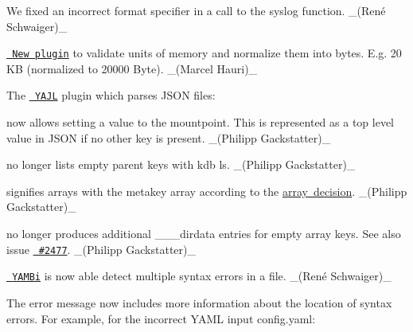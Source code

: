 \begin{DoxyItemize}
\item We fixed an incorrect format specifier in a call to the {\ttfamily syslog} function. \+\_\+(René Schwaiger)\+\_\+
\end{DoxyItemize}


\begin{DoxyItemize}
\item \href{https://www.libelektra.org/plugins/unit}{\texttt{ New plugin}} to validate units of memory and normalize them into bytes. E.\+g. 20 KB (normalized to 20000 Byte). \+\_\+(\+Marcel Hauri)\+\_\+
\end{DoxyItemize}

The \href{https://www.libelektra.org/plugins/yajl}{\texttt{ Y\+A\+JL}} plugin which parses J\+S\+ON files\+:


\begin{DoxyItemize}
\item now allows setting a value to the mountpoint. This is represented as a top level value in J\+S\+ON if no other key is present. \+\_\+(\+Philipp Gackstatter)\+\_\+
\item no longer lists empty parent keys with {\ttfamily kdb ls}. \+\_\+(\+Philipp Gackstatter)\+\_\+
\item signifies arrays with the metakey array according to the \mbox{\hyperlink{doc_decisions_array_md}{array decision}}. \+\_\+(\+Philipp Gackstatter)\+\_\+
\item no longer produces additional {\ttfamily \+\_\+\+\_\+\+\_\+dirdata} entries for empty array keys. See also issue \href{https://github.com/ElektraInitiative/libelektra/issues/2477}{\texttt{ \#2477}}. \+\_\+(\+Philipp Gackstatter)\+\_\+
\end{DoxyItemize}


\begin{DoxyItemize}
\item \href{https://www.libelektra.org/plugins/yambi}{\texttt{ Y\+A\+M\+Bi}} is now able detect multiple syntax errors in a file. \+\_\+(René Schwaiger)\+\_\+
\item The error message now includes more information about the location of syntax errors. For example, for the incorrect Y\+A\+ML input {\ttfamily config.\+yaml}\+:
\end{DoxyItemize}


\begin{DoxyCode}{0}
\end{DoxyCode}


